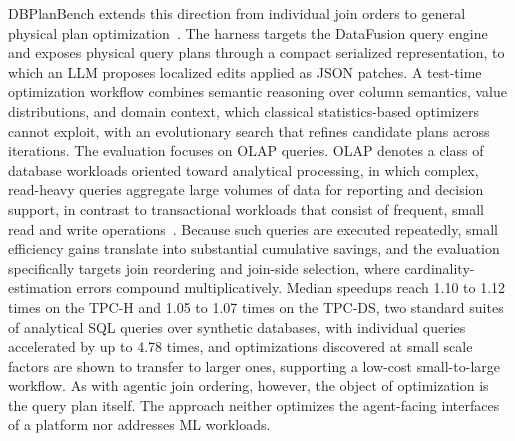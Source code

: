 \documentclass[
english,                 %
bibtex,                  %
]{kththesis}
\numberwithin{listing}{chapter}
\begin{document}
\gls{DB}Plan\Gls{Bench} extends this direction from individual join orders to general physical plan optimization~\cite{erol_test-time_2026}. The harness targets the DataFusion query engine and exposes physical query plans through a compact serialized representation, to which an \gls{LLM} proposes localized edits applied as \gls{JSON} patches. A test-time optimization workflow combines semantic reasoning over column semantics, value distributions, and domain context, which classical statistics-based optimizers cannot exploit, with an evolutionary search that refines candidate plans across iterations. The evaluation focuses on \gls{OLAP} queries. \Gls{OLAP} denotes a class of database workloads oriented toward analytical processing, in which complex, read-heavy queries aggregate large volumes of data for reporting and decision support, in contrast to transactional workloads that consist of frequent, small read and write operations~\cite{chaudhuri_overview_1997}. Because such queries are executed repeatedly, small efficiency gains translate into substantial cumulative savings, and the evaluation specifically targets join reordering and join-side selection, where cardinality-estimation errors compound multiplicatively. Median speedups reach 1.10 to 1.12 times on the \gls{TPC-H} and 1.05 to 1.07 times on the \gls{TPC-DS}, two standard suites of analytical \gls{SQL} queries over synthetic databases, with individual queries accelerated by up to 4.78 times, and optimizations discovered at small scale factors are shown to transfer to larger ones, supporting a low-cost small-to-large workflow. As with agentic join ordering, however, the object of optimization is the query plan itself. The approach neither optimizes the agent-facing interfaces of a platform nor addresses \gls{ML} workloads.
\end{document}
